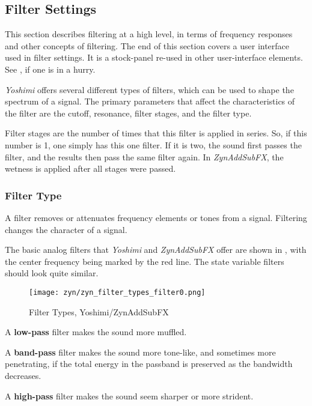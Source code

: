 \subsection{Filter Settings}
\label{subsec:filter_settings}

   This section describes filtering at a high level, in terms of frequency
   responses and other concepts of filtering.
   The end of this section covers a user interface used in filter settings.
   It is a stock-panel re-used in other user-interface elements.
   See ,
   if one is in a hurry.

   \textsl{Yoshimi}
   offers several different types of filters, which can be used to
   shape the spectrum of a signal. The primary parameters that affect the
   characteristics of the filter are the cutoff, resonance, filter stages, and
   the filter type.

   Filter stages are the number of times that this filter is applied in
   series. So, if this number is 1, one simply has this one filter. If it is
   two, the sound first passes the filter, and the results then pass the same
   filter again. In \textsl{ZynAddSubFX}, the wetness is applied after all
   stages were passed.

\subsubsection{Filter Type}
\label{subsubsec:filter_type}

   A filter removes or attenuates frequency elements or tones from a signal.
   Filtering changes the character of a signal.

   The basic analog filters that \textsl{Yoshimi} and \textsl{ZynAddSubFX}
   offer are shown in , with
   the center frequency being marked by the red
   line. The state variable filters should look quite similar.

\begin{figure}[H]          %
   \centering 
   \texttt{[image: zyn/zyn\_filter\_types\_filter0.png]}
   \caption[Basic Filter Types]{Filter Types, Yoshimi/ZynAddSubFX}
   \label{fig:basic_filter_types} 
\end{figure}

   \begin{enumber}
      \item A \textbf{low-pass} filter makes the sound more muffled.
      \item A \textbf{band-pass} filter makes the sound more tone-like, and
         sometimes more penetrating, if the total energy in the passband is
         preserved as the bandwidth decreases.
      \item A \textbf{high-pass} filter makes the sound seem sharper or more
         strident.
   \end{enumber}

